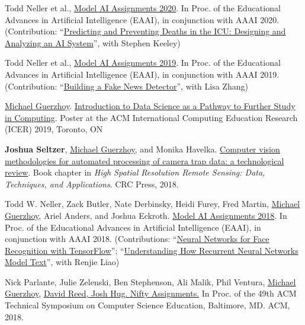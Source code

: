 \documentclass[letterpaper,11pt]{article}
\begin{document}
\begin{revnumerate}
\item Todd Neller et al., \href{https://modelai.gettysburg.edu/2020/}{Model AI Assignments 2020}. In Proc. of the Educational Advances in Artificial Intelligence (EAAI), in conjunction with AAAI 2020. (Contribution: ``\href{https://modelai.gettysburg.edu/2020/icu/}{Predicting and Preventing Deaths in the ICU: Designing and Analyzing an AI System}'', with Stephen Keeley)
\item Todd Neller et al., \href{https://modelai.gettysburg.edu/2019/}{Model AI Assignments 2019}. In Proc. of the Educational Advances in Artificial Intelligence (EAAI), in conjunction with AAAI 2019. (Contribution: ``\href{https://modelai.gettysburg.edu/2019/fakenews/}{Building a Fake News Detector}'', with Lisa Zhang)


\item \underline{Michael Guerzhoy}. \href{https://doi.org/10.1145/3291279.3341203}{Introduction to Data Science as a Pathway to Further Study in Computing}. Poster at the ACM International Computing Education Research (ICER) 2019, Toronto, ON

\item
\textbf{Joshua Seltzer}, \underline{Michael Guerzhoy}, and Monika Havelka. \href{https://doi.org/10.1201/9780429470196-11}{Computer vision methodologies for automated processing of camera trap data: a technological review}. Book chapter in \textit{High Spatial Resolution Remote Sensing: Data, Techniques, and Applications}.  CRC Press, 2018.


\item Todd W. Neller, Zack Butler, Nate Derbinsky, Heidi Furey, Fred Martin, \underline{Michael Guerzhoy}, Ariel Anders, and Joshua Eckroth. \href{https://modelai.gettysburg.edu/2018/}{Model AI Assignments 2018}.  In Proc. of the Educational Advances in Artificial Intelligence (EAAI), in conjunction with AAAI 2018. (Contributions: ``\href{http://modelai.gettysburg.edu/2018/nnfaces/}{Neural Networks for Face Recognition with TensorFlow}''; ``\href{http://www.cs.toronto.edu/~guerzhoy/modelai2018/understand-rnn/webpage/}{Understanding How Recurrent Neural Networks Model Text}'', with Renjie Liao)

\item  Nick Parlante, Julie Zelenski, Ben Stephenson, Ali Malik, Phil Ventura, \underline{Michael Guerzhoy}, \href{http://nifty.stanford.edu/2018/guerzhoy-pong-ai-tournament/}{David Reed, Josh Hug. Nifty Assignments.}  In Proc. of the 49th ACM Technical Symposium on Computer Science Education, Baltimore, MD. ACM, 2018.



\end{revnumerate}
\end{document}
